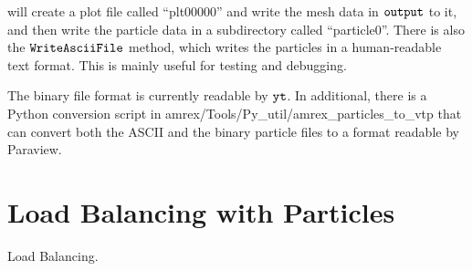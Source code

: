 will create a plot file called ``plt00000'' and write the mesh data in $\tt{output}$ to it, and then write the particle data in a subdirectory called ``particle0''. There is also the $\tt{WriteAsciiFile}$ method, which writes the particles in a human-readable text format. This is mainly useful for testing and debugging.

The binary file format is currently readable by $\tt{yt}$. In additional, there is a Python conversion script in amrex/Tools/Py_util/amrex_particles_to_vtp that can convert both the ASCII and the binary particle files to a format readable by Paraview. 

\section{Load Balancing with Particles}
\label{sec:Particles:Balancing}

Load Balancing.

